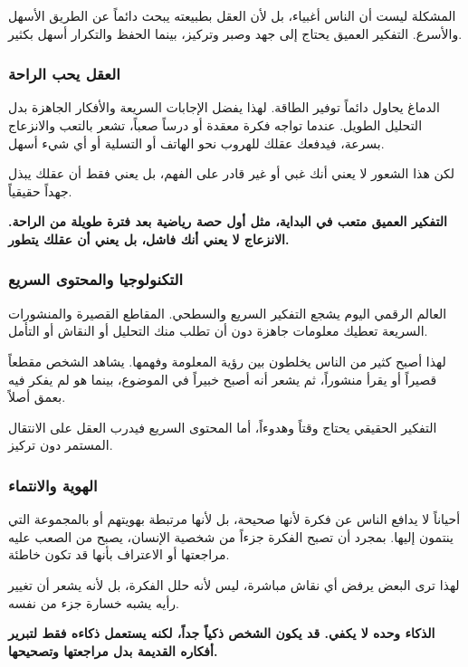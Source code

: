 \documentclass[12pt,a4paper]{book}
\newcommand{\importantAr}[1]{%
	\begin{important}
		\bfseries #1
	\end{important}
}
\begin{document}
	المشكلة ليست أن الناس أغبياء، بل لأن العقل بطبيعته يبحث دائماً عن الطريق الأسهل والأسرع. التفكير العميق يحتاج إلى جهد وصبر وتركيز، بينما الحفظ والتكرار أسهل بكثير.
	
	\subsubsection*{العقل يحب الراحة}
	
	الدماغ يحاول دائماً توفير الطاقة. لهذا يفضل الإجابات السريعة والأفكار الجاهزة بدل التحليل الطويل. عندما تواجه فكرة معقدة أو درساً صعباً، تشعر بالتعب والانزعاج بسرعة، فيدفعك عقلك للهروب نحو الهاتف أو التسلية أو أي شيء أسهل.
	
	لكن هذا الشعور لا يعني أنك غبي أو غير قادر على الفهم، بل يعني فقط أن عقلك يبذل جهداً حقيقياً.
	
	\importantAr{
		التفكير العميق متعب في البداية، مثل أول حصة رياضية بعد فترة طويلة من الراحة. الانزعاج لا يعني أنك فاشل، بل يعني أن عقلك يتطور.
	}
	
	\subsubsection*{التكنولوجيا والمحتوى السريع}
	
	العالم الرقمي اليوم يشجع التفكير السريع والسطحي. المقاطع القصيرة والمنشورات السريعة تعطيك معلومات جاهزة دون أن تطلب منك التحليل أو النقاش أو التأمل.
	
	لهذا أصبح كثير من الناس يخلطون بين رؤية المعلومة وفهمها. يشاهد الشخص مقطعاً قصيراً أو يقرأ منشوراً، ثم يشعر أنه أصبح خبيراً في الموضوع، بينما هو لم يفكر فيه بعمق أصلاً.
	
	التفكير الحقيقي يحتاج وقتاً وهدوءاً، أما المحتوى السريع فيدرب العقل على الانتقال المستمر دون تركيز.
	
	\subsubsection*{الهوية والانتماء}
	
	أحياناً لا يدافع الناس عن فكرة لأنها صحيحة، بل لأنها مرتبطة بهويتهم أو بالمجموعة التي ينتمون إليها. بمجرد أن تصبح الفكرة جزءاً من شخصية الإنسان، يصبح من الصعب عليه مراجعتها أو الاعتراف بأنها قد تكون خاطئة.
	
	لهذا ترى البعض يرفض أي نقاش مباشرة، ليس لأنه حلل الفكرة، بل لأنه يشعر أن تغيير رأيه يشبه خسارة جزء من نفسه.
	
	\importantAr{
		الذكاء وحده لا يكفي. قد يكون الشخص ذكياً جداً، لكنه يستعمل ذكاءه فقط لتبرير أفكاره القديمة بدل مراجعتها وتصحيحها.
	}
	
\end{document}

